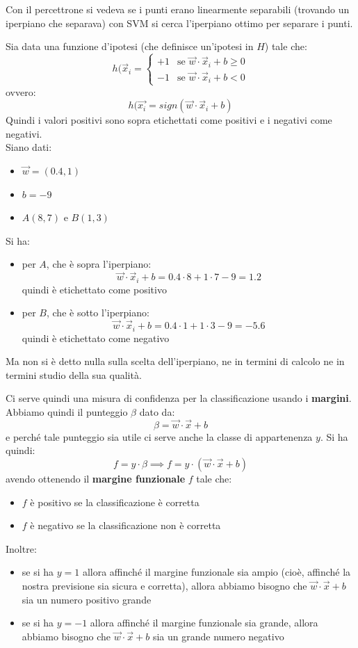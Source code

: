\documentclass[a4paper,12pt, oneside]{book}
\begin{document}
Con il percettrone si vedeva se i punti erano linearmente separabili (trovando
un iperpiano che separava) con SVM si cerca l'iperpiano ottimo per separare i
punti.
\begin{esempio}
  Sia data una funzione d'ipotesi (che definisce un'ipotesi in $H$) tale che:
  \[h(\vec{x}_i=
    \begin{cases}
      +1&\mbox{se }\vec{w}\cdot\vec{x}_i+b\geq 0\\
      -1&\mbox{se }\vec{w}\cdot\vec{x}_i+b< 0
    \end{cases}
  \]
  ovvero:
  \[h(\vec{x_i}=sign(\vec{w}\cdot\vec{x}_i+b)\]
  Quindi i valori positivi sono sopra etichettati come positivi e i negativi
  come  negativi.\\
  Siano dati:
  \begin{itemize}
    \item $\vec{w}=(0.4,1)$
    \item $b=-9$
    \item $A(8,7)$ e $B(1,3)$
  \end{itemize}
  Si ha:
  \begin{itemize}
    \item per $A$, che è sopra l'iperpiano:
    \[\vec{w}\cdot\vec{x}_i+b=0.4\cdot 8+1\cdot 7-9=1.2\]
    quindi è etichettato come positivo
    \item per $B$, che è sotto l'iperpiano:
    \[\vec{w}\cdot\vec{x}_i+b=0.4\cdot 1+1\cdot 3-9=-5.6\]
    quindi è etichettato come negativo
  \end{itemize}
  Ma non si è detto nulla sulla scelta dell'iperpiano, ne in termini di calcolo
  ne in termini studio della sua qualità.
\end{esempio}
Ci serve quindi una misura di confidenza per la classificazione usando i
\textbf{margini}. \\
Abbiamo quindi il punteggio $\beta$ dato da:
\[\beta=\vec{w}\cdot\vec{x}+b\]
e perché tale punteggio sia utile ci serve anche la classe di appartenenza
$y$. Si ha quindi:
\[f=y\cdot\beta\implies f=y\cdot(\vec{w}\cdot\vec{x}+b)\]
avendo ottenendo il \textbf{margine funzionale} $f$ tale che:
\begin{itemize}
  \item $f$ è positivo se la classificazione è corretta
  \item $f$ è negativo se la classificazione non è corretta
\end{itemize}
Inoltre:
\begin{itemize}
  \item se si ha $y=1$ allora affinché il margine funzionale sia ampio (cioè,
  affinché la nostra previsione sia sicura e corretta), allora abbiamo bisogno
  che $\vec{w}\cdot\vec{x}+b$ sia un numero positivo grande 
  \item se si ha $y=-1$ allora affinché il margine funzionale sia grande, allora
  abbiamo bisogno che $\vec{w}\cdot\vec{x}+b$ sia un grande numero negativo 
\end{itemize}
\end{document}
